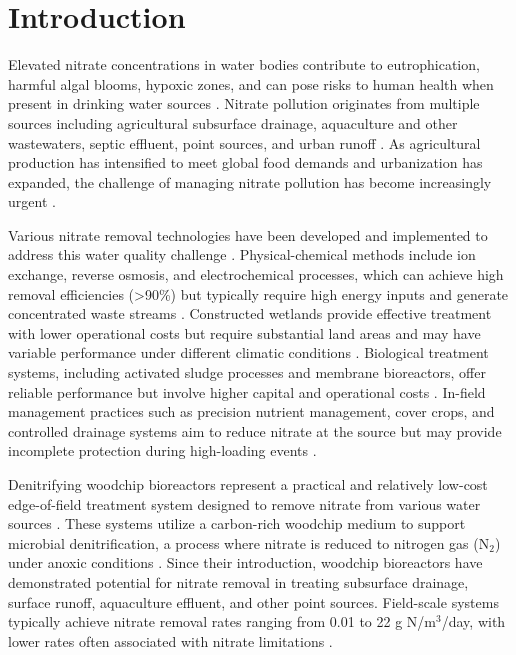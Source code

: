 \documentclass[12pt,a4paper]{article}
\begin{document}
\section{Introduction}

Elevated nitrate concentrations in water bodies contribute to eutrophication, harmful algal blooms, hypoxic zones, and can pose risks to human health when present in drinking water sources \citep{RN1181}. Nitrate pollution originates from multiple sources including agricultural subsurface drainage, aquaculture and other wastewaters, septic effluent, point sources, and urban runoff \citep{RN1181, RN310}. As agricultural production has intensified to meet global food demands and urbanization has expanded, the challenge of managing nitrate pollution has become increasingly urgent \citep{RN312}.

Various nitrate removal technologies have been developed and implemented to address this water quality challenge \citep{RN625, RN826}. Physical-chemical methods include ion exchange, reverse osmosis, and electrochemical processes, which can achieve high removal efficiencies (>90\%) but typically require high energy inputs and generate concentrated waste streams \citep{RN625}. Constructed wetlands provide effective treatment with lower operational costs but require substantial land areas and may have variable performance under different climatic conditions \citep{RN826}. Biological treatment systems, including activated sludge processes and membrane bioreactors, offer reliable performance but involve higher capital and operational costs \citep{RN625}. In-field management practices such as precision nutrient management, cover crops, and controlled drainage systems aim to reduce nitrate at the source but may provide incomplete protection during high-loading events \citep{RN826}.

Denitrifying woodchip bioreactors represent a practical and relatively low-cost edge-of-field treatment system designed to remove nitrate from various water sources \citep{RN625, RN310}. These systems utilize a carbon-rich woodchip medium to support microbial denitrification, a process where nitrate is reduced to nitrogen gas (N$_{2}$) under anoxic conditions \citep{RN242, RN629}. Since their introduction, woodchip bioreactors have demonstrated potential for nitrate removal in treating subsurface drainage, surface runoff, aquaculture effluent, and other point sources. Field-scale systems typically achieve nitrate removal rates ranging from 0.01 to 22 g N/m$^3$/day, with lower rates often associated with nitrate limitations \citep{RN625, RN310}.
\end{document}
